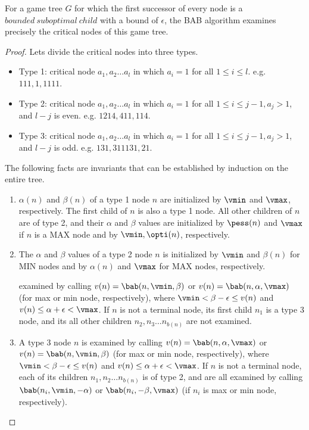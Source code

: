 \begin{theorem}
 For a game tree $G$ for which the first successor of every node is a $\mathit{bounded~suboptimal~child}$ with a bound of $\epsilon$, the BAB algorithm examines precisely the critical nodes of this game tree.
\label{the:newbest}
\end{theorem}
\begin{proof}
Lets divide the critical nodes into three types.

\begin{itemize}
  \item Type 1: critical node $a_1, a_2 \ldots a_l$ in which $a_i=1$ for all $1 \leq i \leq l$. e.g. $111, 1, 1111$.
  
  \item Type 2: critical node $a_1, a_2 \ldots a_l$ in which $a_i=1$ for all $1 \leq i \leq j-1, a_j>1$, and $l-j$ is even. e.g. $1214, 411, 114$.
  
  \item Type 3: critical node $a_1, a_2 \ldots a_l$ in which $a_i=1$ for all $1 \leq i \leq j-1, a_j>1$, and $l-j$ is odd. e.g. $131, 311131, 21$.
\end{itemize}


The following facts are invariants that can be established by induction on the entire tree.

\begin{enumerate}

  \item $\alpha(n)$ and $\beta(n)$ of a type 1 node $n$ are initialized by $\vmin$ and $\vmax$, respectively. The first child of $n$ is also a type 1 node. All other children of $n$ are of type 2, and their $\alpha$ and $\beta$ values are initialized by $\pess(n)$ and $\vmax$ if $n$ is a MAX node and by $\vmin, \opti(n)$, respectively. 
  
  \item The $\alpha$ and $\beta$ values of a type 2 node $n$ is initialized by $\vmin$ and $\beta(n)$ for MIN nodes and by $\alpha(n)$ and $\vmax$ for MAX nodes, respectively. 
  
  examined by calling $v(n) = \bab(n, \vmin, \beta)$ or $v(n) = \bab(n,\alpha, \vmax)$ (for max or min node, respectively), where 
$\vmin < \beta - \epsilon  \leq  v(n)$ and $v(n)  \leq  \alpha + \epsilon < \vmax$. If $n$ is not a terminal node, its  first child $n_1$ is a type 3 node, and its all other children $n_2, n_3 \ldots n_{b(n)}$ are not examined.
 
  \item A type 3 node $n$ is examined by calling $v(n) = \bab(n,\alpha, \vmax)$ or $v(n) = \bab(n, \vmin, \beta)$ (for max or min node, respectively), where
$\vmin < \beta - \epsilon  \leq  v(n)$ and $v(n)  \leq  \alpha + \epsilon < \vmax$. If $n$ is not a terminal node, each of its children $n_1, n_2 \ldots n_{b(n)}$ 
is of type 2, and are all examined by calling $\bab(n_i, \vmin, -\alpha)$ or $\bab(n_i, -\beta, \vmax)$ (if $n_i$ is max or min node, respectively).

\end{enumerate}

\end{proof}

